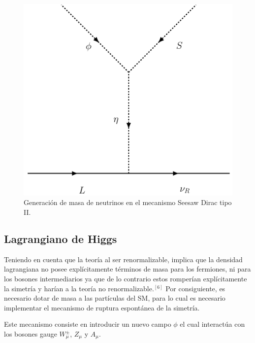\documentclass[12pt]{article}
\begin{document}
\begin{figure}[h!]
\begin{center}
\includegraphics[scale=0.5]{DiracSeeSAWFinally.pdf}
\caption{Generación de masa de neutrinos en el mecanismo Seesaw Dirac tipo II.}
\label{fig:FinallyDiagram}
\end{center}
\end{figure}


\subsection{Lagrangiano de Higgs}

Teniendo en cuenta que la teoría al ser renormalizable, implica que la densidad lagrangiana no posee explícitamente términos de masa para los fermiones, ni para los bosones intermediarios ya que de lo contrario estos romperían explícitamente la simetría y harían a la teoría no renormalizable.$^{[6]}$ Por consiguiente, es necesario dotar de masa a las partículas del SM, para lo cual es necesario implementar el mecanismo de ruptura espontánea de la simetría.

Este mecanismo consiste en introducir un nuevo campo $\phi $ el cual interactúa con los bosones gauge $W^{\pm}_\mu$, $Z_\mu$ y $A_\mu$. \\
\end{document}
